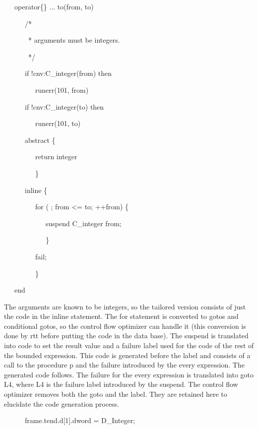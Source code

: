 {\ttfamily\mdseries
\ \ \ operator\{\} ... to(from, to)}

{\ttfamily\mdseries
\ \ \ \ \ \ /*}

{\ttfamily\mdseries
\ \ \ \ \ \ \ * arguments must be integers.}

{\ttfamily\mdseries
\ \ \ \ \ \ \ */}

{\ttfamily\mdseries
\ \ \ \ \ \ if !cnv:C\_integer(from) then}

{\ttfamily\mdseries
\ \ \ \ \ \ \ \ \ runerr(101, from)}

{\ttfamily\mdseries
\ \ \ \ \ \ if !cnv:C\_integer(to) then}

{\ttfamily\mdseries
\ \ \ \ \ \ \ \ \ runerr(101, to)}

{\ttfamily\mdseries
\ \ \ \ \ \ abstract \{}

{\ttfamily\mdseries
\ \ \ \ \ \ \ \ \ return integer}

{\ttfamily\mdseries
\ \ \ \ \ \ \ \ \ \}}

{\ttfamily\mdseries
\ \ \ \ \ \ inline \{}

{\ttfamily\mdseries
\ \ \ \ \ \ \ \ \ for ( ; from {\textless}= to; ++from) \{}

{\ttfamily\mdseries
\ \ \ \ \ \ \ \ \ \ \ \ suspend C\_integer from;}

{\ttfamily\mdseries
\ \ \ \ \ \ \ \ \ \ \ \ \}}

{\ttfamily\mdseries
\ \ \ \ \ \ \ \ \ fail;}

{\ttfamily\mdseries
\ \ \ \ \ \ \ \ \ \}}

{\ttfamily\mdseries
\ \ \ end}


The arguments are known to be integers, so the tailored version
consists of just the code in the inline statement. The for statement
is converted to gotos and conditional gotos, so the control flow
optimizer can handle it (this conversion is done by rtt before putting
the code in the data base). The suspend is translated into code to set
the result value and a failure label used for the code of the rest of
the bounded expression. This code is generated before the label and
consists of a call to the procedure p and the failure introduced by
the every expression. The generated code follows. The failure for the
every expression is translated into goto L4, where L4 is the failure
label introduced by the suspend. The control flow optimizer removes
both the goto and the label. They are retained here to elucidate the
code generation process.

{\ttfamily\mdseries
\ \ \ \ \ \ frame.tend.d[1].dword = D\_Integer;}

